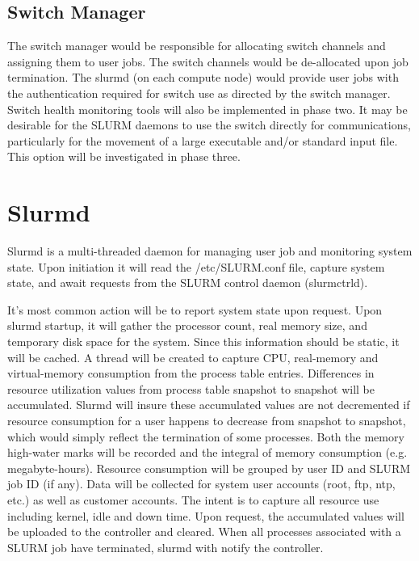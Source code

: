 \subsection{Switch Manager}

The switch manager would be responsible for allocating switch channels and assigning 
them to user jobs. The switch channels would be de-allocated upon job termination. 
The slurmd (on each compute node) would provide user jobs with the authentication 
required for switch use as directed by the switch manager. Switch health monitoring tools will 
also be implemented in phase two. It may be desirable for the SLURM daemons to use the
switch directly for communications, particularly for the movement of a large 
executable and/or standard input file. This option will be investigated in phase
three. 

\section{Slurmd}

Slurmd is a multi-threaded daemon for managing user job and 
monitoring system state. 
Upon initiation it will read the /etc/SLURM.conf file, capture 
system state, and await requests from the SLURM control daemon 
(slurmctrld). 

It's most common action will be to report system state upon 
request. Upon slurmd startup, it will gather the processor 
count, real memory size, and temporary disk space for the 
system. Since this information should be static, it will be 
cached. A thread will be created to capture CPU, real-memory 
and virtual-memory consumption from the process table entries. 
Differences in resource utilization values from process table 
snapshot to snapshot will be accumulated. Slurmd will 
insure these accumulated values are not decremented if resource 
consumption for a user happens to decrease from snapshot to 
snapshot, which would simply reflect the termination of some 
processes.
Both the memory high-water marks will be recorded and the 
integral of memory consumption (e.g. megabyte-hours).
Resource consumption will be grouped by user ID and 
SLURM job ID (if any). Data will be collected for 
system user accounts (root, ftp, ntp, etc.) as well as 
customer accounts. The intent is to capture all resource 
use including kernel, idle and down time. 
Upon request, the accumulated values will be uploaded to 
the controller and cleared. 
When all processes associated with a SLURM job have terminated, 
slurmd with notify the controller. 

